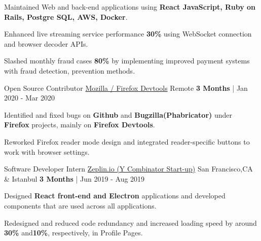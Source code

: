 \begin{cventries}
{\begin{cvitems}
        \item {Maintained Web and back-end applications using \textbf{ React JavaScript, Ruby on Rails, Postgre SQL, AWS, Docker}.}
	\item {Enhanced live streaming service performance \textbf{30\%} using WebSocket connection and browser decoder APIs.}
	\item {Slashed monthly fraud cases \textbf{80\%} by implementing improved payment systems with fraud detection, prevention methods.}
      \end{cvitems}
    }
  \cvexpentry
   {Open Source Contributor} %
    {\href{https://www.mozilla.org}{Mozilla / Firefox Devtools}} %
    {Remote} %
    {\textbf{3 Months} | Jan 2020 - Mar 2020} %
    {
      \begin{cvitems} %
        \item {Identified and fixed bugs on \textbf{Github} and \textbf{Bugzilla(Phabricator)} under \textbf{Firefox} projects, mainly on \textbf{Firefox Devtools}.}
        \item {Reworked Firefox reader mode design and integrated reader-specific buttons to work with browser settings.}
      \end{cvitems}
    }
  \cvexpentry
   {Software Developer Intern} %
    {\href{https://zeplin.io}{Zeplin.io (Y Combinator Start-up)}} %
    {San Francisco,CA \& Istanbul} %
    {\textbf{3 Months} | Jun 2019 - Aug 2019} %
    {
      \begin{cvitems} %
        \item {Designed \textbf{React front-end and Electron} applications and developed components that are used across all applications.}
        \item {Redesigned and reduced code redundancy and increased loading speed by around \textbf{30\%} and\textbf{10\%}, respectively, in Profile Pages.}
      \end{cvitems}
}
\end{cventries}
